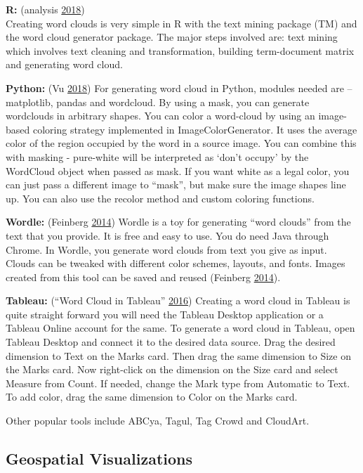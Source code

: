 \documentclass[]{book}
\begin{document}
\textbf{R:} (analysis \protect\hyperlink{ref-r}{2018})\\
Creating word clouds is very simple in R with the text mining package (TM) and the word cloud generator package. The major steps involved are: text mining which involves text cleaning and transformation, building term-document matrix and generating word cloud.

\textbf{Python:} (Vu \protect\hyperlink{ref-python_wordcloud}{2018})
For generating word cloud in Python, modules needed are -- matplotlib, pandas and wordcloud. By using a mask, you can generate wordclouds in arbitrary shapes. You can color a word-cloud by using an image-based coloring strategy implemented in ImageColorGenerator. It uses the average color of the region occupied by the word in a source image. You can combine this with masking - pure-white will be interpreted as `don't occupy' by the WordCloud object when passed as mask. If you want white as a legal color, you can just pass a different image to ``mask'', but make sure the image shapes line up. You can also use the recolor method and custom coloring functions.

\textbf{Wordle:} (Feinberg \protect\hyperlink{ref-wordle}{2014})
Wordle is a toy for generating ``word clouds'' from the text that you provide. It is free and easy to use. You do need Java through Chrome. In Wordle, you generate word clouds from text you give as input. Clouds can be tweaked with different color schemes, layouts, and fonts. Images created from this tool can be saved and reused (Feinberg \protect\hyperlink{ref-wordle}{2014}).

\textbf{Tableau:} (``Word Cloud in Tableau'' \protect\hyperlink{ref-Tableau_wordcloud}{2016})
Creating a word cloud in Tableau is quite straight forward you will need the Tableau Desktop application or a Tableau Online account for the same. To generate a word cloud in Tableau, open Tableau Desktop and connect it to the desired data source. Drag the desired dimension to Text on the Marks card. Then drag the same dimension to Size on the Marks card. Now right-click on the dimension on the Size card and select Measure from Count. If needed, change the Mark type from Automatic to Text. To add color, drag the same dimension to Color on the Marks card.

Other popular tools include ABCya, Tagul, Tag Crowd and CloudArt.

\hypertarget{geospatial-visualizations}{%
\subsection{Geospatial Visualizations}\label{geospatial-visualizations}}
\end{document}
